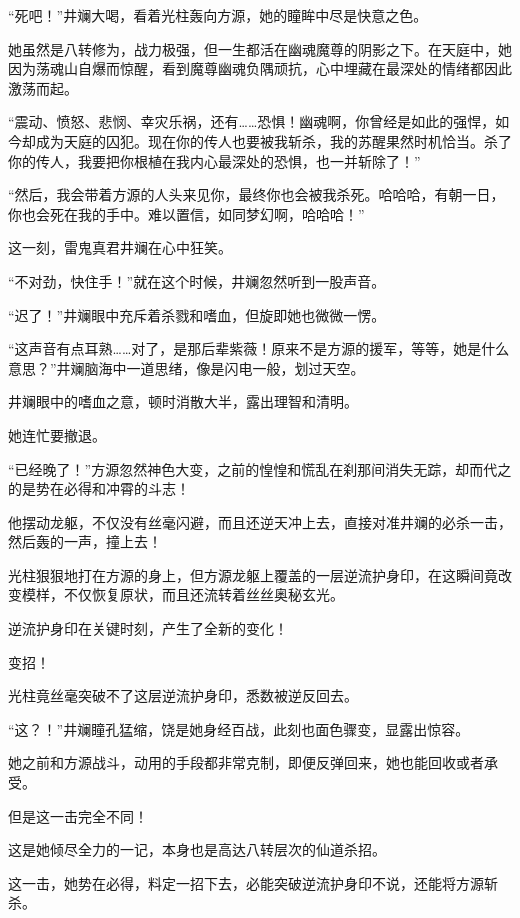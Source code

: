 
\begin{this_body}

“死吧！”井斓大喝，看着光柱轰向方源，她的瞳眸中尽是快意之色。

她虽然是八转修为，战力极强，但一生都活在幽魂魔尊的阴影之下。在天庭中，她因为荡魂山自爆而惊醒，看到魔尊幽魂负隅顽抗，心中埋藏在最深处的情绪都因此激荡而起。

“震动、愤怒、悲悯、幸灾乐祸，还有……恐惧！幽魂啊，你曾经是如此的强悍，如今却成为天庭的囚犯。现在你的传人也要被我斩杀，我的苏醒果然时机恰当。杀了你的传人，我要把你根植在我内心最深处的恐惧，也一并斩除了！”

“然后，我会带着方源的人头来见你，最终你也会被我杀死。哈哈哈，有朝一日，你也会死在我的手中。难以置信，如同梦幻啊，哈哈哈！”

这一刻，雷鬼真君井斓在心中狂笑。

“不对劲，快住手！”就在这个时候，井斓忽然听到一股声音。

“迟了！”井斓眼中充斥着杀戮和嗜血，但旋即她也微微一愣。

“这声音有点耳熟……对了，是那后辈紫薇！原来不是方源的援军，等等，她是什么意思？”井斓脑海中一道思绪，像是闪电一般，划过天空。

井斓眼中的嗜血之意，顿时消散大半，露出理智和清明。

她连忙要撤退。

“已经晚了！”方源忽然神色大变，之前的惶惶和慌乱在刹那间消失无踪，却而代之的是势在必得和冲霄的斗志！

他摆动龙躯，不仅没有丝毫闪避，而且还逆天冲上去，直接对准井斓的必杀一击，然后轰的一声，撞上去！

光柱狠狠地打在方源的身上，但方源龙躯上覆盖的一层逆流护身印，在这瞬间竟改变模样，不仅恢复原状，而且还流转着丝丝奥秘玄光。

逆流护身印在关键时刻，产生了全新的变化！

变招！

光柱竟丝毫突破不了这层逆流护身印，悉数被逆反回去。

“这？！”井斓瞳孔猛缩，饶是她身经百战，此刻也面色骤变，显露出惊容。

她之前和方源战斗，动用的手段都非常克制，即便反弹回来，她也能回收或者承受。

但是这一击完全不同！

这是她倾尽全力的一记，本身也是高达八转层次的仙道杀招。

这一击，她势在必得，料定一招下去，必能突破逆流护身印不说，还能将方源斩杀。


\end{this_body}
